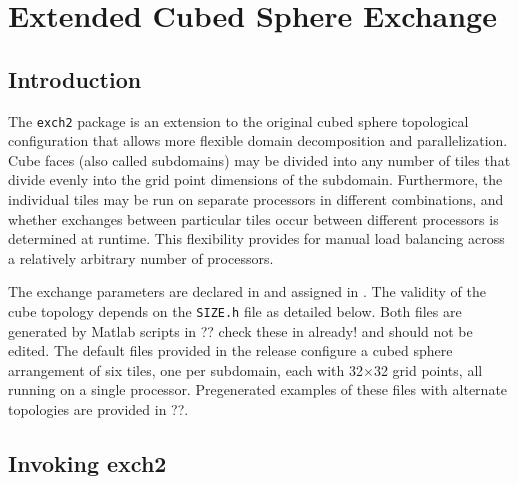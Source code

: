 


\section{Extended Cubed Sphere Exchange}
\label{sec:exch2}


\subsection{Introduction}

The \texttt{exch2} package is an extension to the original cubed
sphere topological configuration that allows more flexible domain
decomposition and parallelization.  Cube faces (also called
subdomains) may be divided into any number of tiles that divide evenly
into the grid point dimensions of the subdomain.  Furthermore, the
individual tiles may be run on separate processors in different
combinations, and whether exchanges between particular tiles occur
between different processors is determined at runtime.  This
flexibility provides for manual load balancing across a relatively
arbitrary number of processors.

The exchange parameters are declared in
and assigned in
. The
validity of the cube topology depends on the \texttt{SIZE.h} file as
detailed below.  Both files are generated by Matlab scripts in ??
check these in already! and should not be edited.  The default files
provided in the release configure a cubed sphere arrangement of six
tiles, one per subdomain, each with 32$\times$32 grid points, all
running on a single processor.  Pregenerated examples of these files 
with alternate topologies are provided in ??.

\subsection{Invoking exch2}

